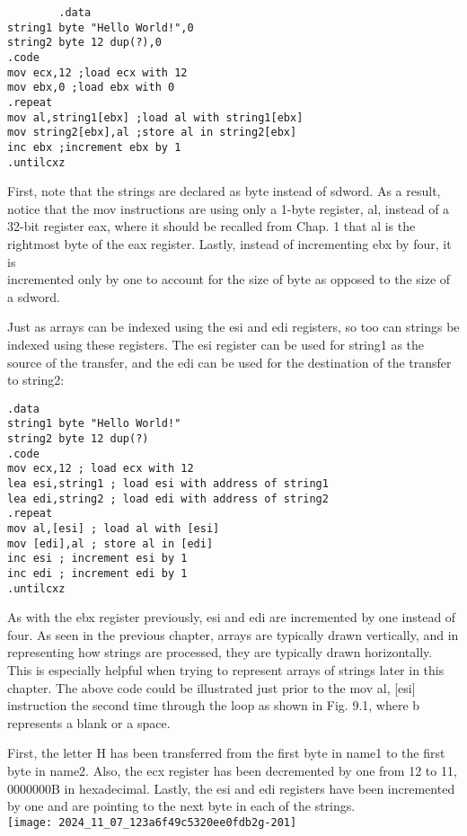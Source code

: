 \documentclass[10pt]{article}
\begin{document}
\begin{verbatim}
        .data
string1 byte "Hello World!",0
string2 byte 12 dup(?),0
.code
mov ecx,12 ;load ecx with 12
mov ebx,0 ;load ebx with 0
.repeat
mov al,string1[ebx] ;load al with string1[ebx]
mov string2[ebx],al ;store al in string2[ebx]
inc ebx ;increment ebx by 1
.untilcxz
\end{verbatim}

First, note that the strings are declared as byte instead of sdword. As a result, notice that the mov instructions are using only a 1-byte register, al, instead of a 32-bit register eax, where it should be recalled from Chap. 1 that al is the rightmost byte of the eax register. Lastly, instead of incrementing ebx by four, it is\\
incremented only by one to account for the size of byte as opposed to the size of a sdword.

Just as arrays can be indexed using the esi and edi registers, so too can strings be indexed using these registers. The esi register can be used for string1 as the source of the transfer, and the edi can be used for the destination of the transfer to string2:

\begin{verbatim}
.data
string1 byte "Hello World!"
string2 byte 12 dup(?)
.code
mov ecx,12 ; load ecx with 12
lea esi,string1 ; load esi with address of string1
lea edi,string2 ; load edi with address of string2
.repeat
mov al,[esi] ; load al with [esi]
mov [edi],al ; store al in [edi]
inc esi ; increment esi by 1
inc edi ; increment edi by 1
.untilcxz
\end{verbatim}

As with the ebx register previously, esi and edi are incremented by one instead of four. As seen in the previous chapter, arrays are typically drawn vertically, and in representing how strings are processed, they are typically drawn horizontally. This is especially helpful when trying to represent arrays of strings later in this chapter. The above code could be illustrated just prior to the mov al, [esi] instruction the second time through the loop as shown in Fig. 9.1, where b represents a blank or a space.

First, the letter H has been transferred from the first byte in name1 to the first byte in name2. Also, the ecx register has been decremented by one from 12 to 11, 0000000B in hexadecimal. Lastly, the esi and edi registers have been incremented by one and are pointing to the next byte in each of the strings.\\
\texttt{[image: 2024\_11\_07\_123a6f49c5320ee0fdb2g-201]}
\end{document}
